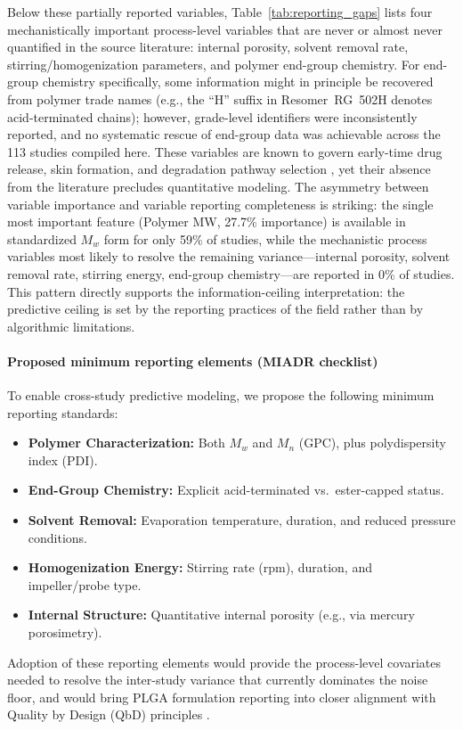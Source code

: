 \documentclass[preprint,12pt,authoryear]{elsarticle}
\begin{document}
Below these partially reported variables, Table~\ref{tab:reporting_gaps} lists four mechanistically important process-level variables that are never or almost never quantified in the source literature: internal porosity, solvent removal rate, stirring/homogenization parameters, and polymer end-group chemistry. For end-group chemistry specifically, some information might in principle be recovered from polymer trade names (e.g., the ``H'' suffix in Resomer~RG~502H denotes acid-terminated chains); however, grade-level identifiers were inconsistently reported, and no systematic rescue of end-group data was achievable across the 113 studies compiled here. These variables are known to govern early-time drug release, skin formation, and degradation pathway selection \citep{Fredenberg2011, Makadia2011}, yet their absence from the literature precludes quantitative modeling. The asymmetry between variable importance and variable reporting completeness is striking: the single most important feature (Polymer MW, 27.7\% importance) is available in standardized $M_w$ form for only 59\% of studies, while the mechanistic process variables most likely to resolve the remaining variance---internal porosity, solvent removal rate, stirring energy, end-group chemistry---are reported in 0\% of studies. This pattern directly supports the information-ceiling interpretation: the predictive ceiling is set by the reporting practices of the field rather than by algorithmic limitations.

\paragraph{Proposed minimum reporting elements (MIADR checklist)}
To enable cross-study predictive modeling, we propose the following minimum reporting standards:
\begin{itemize}
\item \textbf{Polymer Characterization:} Both $M_w$ and $M_n$ (GPC), plus polydispersity index (PDI).
\item \textbf{End-Group Chemistry:} Explicit acid-terminated vs.\ ester-capped status.
\item \textbf{Solvent Removal:} Evaporation temperature, duration, and reduced pressure conditions.
\item \textbf{Homogenization Energy:} Stirring rate (rpm), duration, and impeller/probe type.
\item \textbf{Internal Structure:} Quantitative internal porosity (e.g., via mercury porosimetry).
\end{itemize}
Adoption of these reporting elements would provide the process-level covariates needed to resolve the inter-study variance that currently dominates the noise floor, and would bring PLGA formulation reporting into closer alignment with Quality by Design (QbD) principles \citep{ICH2009}.
\end{document}
